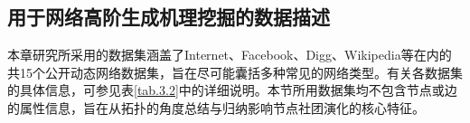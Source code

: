 \subsection{用于网络高阶生成机理挖掘的数据描述}


本章研究所采用的数据集涵盖了Internet、Facebook、Digg、Wikipedia等在内的共15个公开动态网络数据集，旨在尽可能囊括多种常见的网络类型。有关各数据集的具体信息，可参见表\ref{tab.3.2}中的详细说明。本节所用数据集均不包含节点或边的属性信息，旨在从拓扑的角度总结与归纳影响节点社团演化的核心特征。



